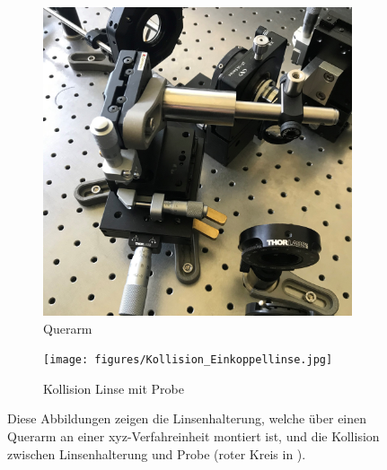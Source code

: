 \documentclass[a4paper, titlepage,  ngerman]{book}
\begin{document}
	\begin{figure}
		\centering
		\begin{subfigure}{0.4\textwidth}
			\centering
			\includegraphics[width=\textwidth]{figures/Einkoppellinse.jpg}
			\caption{Querarm}
			\label{fig:querarm}
		\end{subfigure}
		\hfill
		\begin{subfigure}{0.4\textwidth}
			\centering
			\texttt{[image: figures/Kollision\_Einkoppellinse.jpg]}
			\caption{Kollision Linse mit Probe}
			\label{fig:kollision}
		\end{subfigure}
		\caption[Einkoppellinse-Halterung]{Diese Abbildungen zeigen die Linsenhalterung, welche über einen Querarm an einer xyz-Verfahreinheit montiert ist, und die Kollision zwischen Linsenhalterung und Probe (roter Kreis in ).}
		\label{fig:linsenhalterung}
	\end{figure}
	
\end{document}
